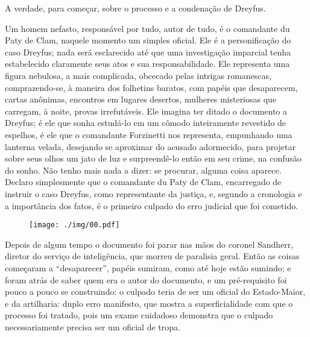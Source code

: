  A verdade, para começar, sobre o processo e a condenação de Dreyfus.

 Um homem nefasto, responsável por tudo, autor de tudo, é o comandante
du Paty de Clam, naquele momento um simples oficial. Ele é a
personificação do caso Dreyfus; nada será esclarecido até que uma
investigação imparcial tenha estabelecido claramente seus atos e sua
responsabilidade. Ele representa uma figura nebulosa, a mais complicada,
obcecado pelas intrigas romanescas, comprazendo-se, à maneira dos folhetins
baratos, com papéis que desaparecem, cartas anônimas, encontros em
lugares desertos, mulheres misteriosas que carregam, à noite, provas
irrefutáveis. Ele imagina ter ditado o documento a Dreyfus; é ele que
sonha estudá-lo em um cômodo inteiramente revestido de espelhos, é
ele que o comandante Forzinetti nos representa, empunhando uma lanterna
velada, desejando se aproximar do acusado adormecido, para projetar
sobre seus olhos um jato de luz e surpreendê-lo então em seu crime,
na confusão do sonho. Não tenho mais nada a dizer: se procurar, alguma
coisa aparece. Declaro simplesmente que o comandante du Paty de Clam,
encarregado de instruir o caso Dreyfus, como representante da justiça,
e, segundo a cronologia e a importância dos fatos, é o primeiro culpado
do erro judicial que foi cometido.

\begin{figure}
\centering
\clearpage
\texttt{[image: ./img/00.pdf]}
\end{figure}

Depois de algum tempo o documento foi parar nas mãos do coronel
Sandherr, diretor do serviço de inteligência, que morreu de paralisia
geral. Então as coisas começaram a ``desaparecer'', papéis sumiram, como até hoje estão
sumindo; e foram atrás de saber quem era o autor do documento, e um
pré-requisito foi pouco a pouco se construindo: o culpado teria de
ser um oficial do Estado-Maior, e da artilharia: duplo erro
manifesto, que mostra a superficialidade com que o processo foi
tratado, pois um exame cuidadoso demonstra que o culpado
necessariamente precisa ser um oficial de tropa.

